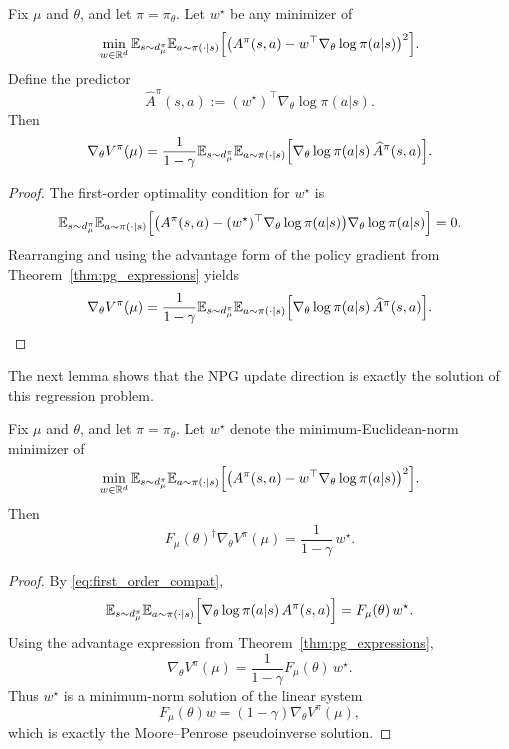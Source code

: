\begin{lemma}
\label{lemma:compatible}
Fix $\mu$ and $\theta$, and let $\pi=\pi_\theta$.
Let $w^\star$ be any minimizer of
\[
\min_{w\in\mathbb{R}^d}
\mathbb{E}_{s\sim d_\mu^\pi}
\mathbb{E}_{a\sim \pi(\cdot|s)}
\Big[
\big(A^\pi(s,a)-w^\top \nabla_\theta \log \pi(a|s)\big)^2
\Big].
\]
Define the predictor
\[
\widehat A^\pi(s,a):=(w^\star)^\top \nabla_\theta \log \pi(a|s).
\]
Then
\[
\nabla_\theta V^\pi(\mu)
=
\frac{1}{1-\gamma}
\mathbb{E}_{s\sim d_\mu^\pi}
\mathbb{E}_{a\sim \pi(\cdot|s)}
\Big[
\nabla_\theta \log \pi(a|s)\,\widehat A^\pi(s,a)
\Big].
\]
\end{lemma}

\begin{proof}
The first-order optimality condition for $w^\star$ is
\begin{equation}\label{eq:first_order_compat}
\mathbb{E}_{s\sim d_\mu^\pi}
\mathbb{E}_{a\sim \pi(\cdot|s)}
\Big[
\big(A^\pi(s,a)-(w^\star)^\top \nabla_\theta \log \pi(a|s)\big)
\nabla_\theta \log \pi(a|s)
\Big]
=
0.
\end{equation}
Rearranging and using the advantage form of the policy gradient from
Theorem~\ref{thm:pg_expressions} yields
\[
\nabla_\theta V^\pi(\mu)
=
\frac{1}{1-\gamma}
\mathbb{E}_{s\sim d_\mu^\pi}
\mathbb{E}_{a\sim \pi(\cdot|s)}
\Big[
\nabla_\theta \log \pi(a|s)\,\widehat A^\pi(s,a)
\Big].
\]
\end{proof}

The next lemma shows that the NPG update direction is exactly the solution of this
regression problem.

\begin{lemma}\label{eq:npg_argmin}
Fix $\mu$ and $\theta$, and let $\pi=\pi_\theta$.
Let $w^\star$ denote the minimum-Euclidean-norm minimizer of
\[
\min_{w\in\mathbb{R}^d}
\mathbb{E}_{s\sim d_\mu^\pi}
\mathbb{E}_{a\sim \pi(\cdot|s)}
\Big[
\big(A^\pi(s,a)-w^\top \nabla_\theta \log \pi(a|s)\big)^2
\Big].
\]
Then
\[
F_\mu(\theta)^\dagger \nabla_\theta V^\pi(\mu)
=
\frac{1}{1-\gamma}\, w^\star.
\]
\end{lemma}

\begin{proof}
By \eqref{eq:first_order_compat},
\[
\mathbb{E}_{s\sim d_\mu^\pi}
\mathbb{E}_{a\sim \pi(\cdot|s)}
\Big[
\nabla_\theta \log \pi(a|s)\,A^\pi(s,a)
\Big]
=
F_\mu(\theta)\,w^\star.
\]
Using the advantage expression from Theorem~\ref{thm:pg_expressions},
\[
\nabla_\theta V^\pi(\mu)
=
\frac{1}{1-\gamma}F_\mu(\theta)\,w^\star.
\]
Thus $w^\star$ is a minimum-norm solution of the linear system
\[
F_\mu(\theta)w=(1-\gamma)\nabla_\theta V^\pi(\mu),
\]
which is exactly the Moore--Penrose pseudoinverse solution.
\end{proof}


